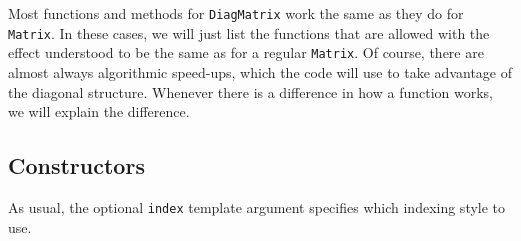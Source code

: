 \documentclass[twoside,letterpaper,11pt]{article}
\renewcommand{\tt}[1]{{\lstinline {#1}}}
\begin{document}
Most functions and methods for \tt{DiagMatrix} work the same
as they do for \tt{Matrix}.
In these cases, we will just list the functions
that are allowed with the
effect understood to be the same as for a regular \tt{Matrix}.  Of course, there are 
almost always algorithmic speed-ups, which the code will use to take advantage of the 
diagonal structure.
Whenever there is a difference in how a function works,
we will explain the difference.

\subsection{Constructors}
\label{DiagMatrix_Constructors}

As usual, the optional \tt{index} template argument specifies which indexing
style to use.
\end{document}
